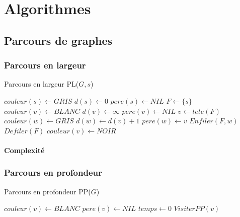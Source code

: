 \documentclass[11pt,a4paper]{report}
\begin{document}

\chapter{Algorithmes}

\section{Parcours de graphes}

\subsection{Parcours en largeur}

\begin{algorithm}
\caption{Parcours en largeur PL($G,s$)}
\begin{algorithmic}[1]
\STATE $couleur(s) \leftarrow GRIS$
\STATE $d(s) \leftarrow 0$
\STATE $pere(s) \leftarrow NIL$
\STATE $F \leftarrow \{s\}$
\STATE $couleur(v) \leftarrow BLANC$
\STATE $d(v) \leftarrow \infty$
\STATE $pere(v) \leftarrow NIL$
\ENDFOR
{}
\STATE $v   \leftarrow tete(F)$
\STATE $couleur(w) \leftarrow GRIS$
\STATE $d(w) \leftarrow d(v) + 1$
\STATE $pere(w) \leftarrow v$
\STATE $Enfiler(F,w)$
\ENDIF
\ENDFOR
\STATE $Defiler(F)$
\STATE $couleur(v) \leftarrow NOIR$
\ENDWHILE
\end{algorithmic}
\end{algorithm}


\subsubsection{Complexité}


\subsection{Parcours en profondeur}

\begin{algorithm}
\caption{Parcours en profondeur PP($G$)}
\begin{algorithmic}[1]
\STATE $couleur(v) \leftarrow BLANC$
\STATE $pere(v) \leftarrow NIL$
\ENDFOR
\STATE $temps \leftarrow 0$
\STATE $VisiterPP(v)$
\ENDIF
\ENDFOR
\end{algorithmic}
\end{algorithm}
\end{document}
